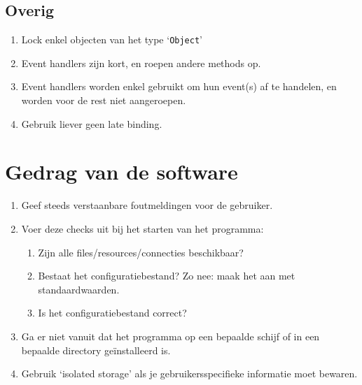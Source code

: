 \documentclass[a4paper,11pt]{article}
\begin{document}
\subsection{Overig}

\begin{enumerate}[resume]
\item Lock enkel objecten van het type `\lstinline !Object!'
\item Event handlers zijn kort, en roepen andere methods op.
\item Event handlers worden enkel gebruikt om hun event(s) af te handelen, en worden voor de rest
niet aangeroepen.
\item Gebruik liever geen late binding.
\end{enumerate}

\section{Gedrag van de software}

\begin{enumerate}[resume]
\item Geef steeds verstaanbare foutmeldingen voor de gebruiker.
\item Voer deze checks uit bij het starten van het programma:
\begin{enumerate}
\item Zijn alle files/resources/connecties beschikbaar?
\item Bestaat het configuratiebestand? Zo nee: maak het aan met standaardwaarden.
\item Is het configuratiebestand correct?
\end{enumerate}
\item Ga er niet vanuit dat het programma op een bepaalde schijf of in een bepaalde directory
ge\"installeerd is.
\item Gebruik `isolated storage' als je gebruikersspecifieke informatie moet bewaren.
\end{enumerate}
\end{document}
